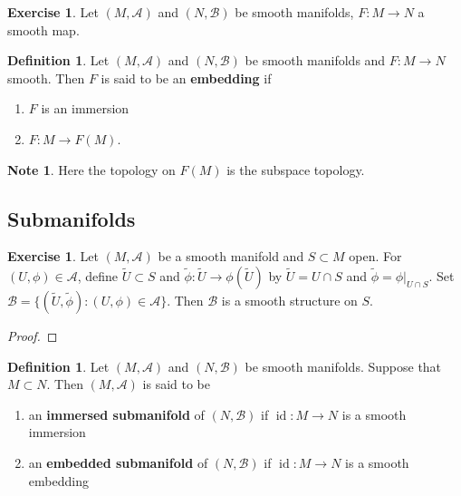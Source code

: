 \documentclass[12pt]{amsart}
\theoremstyle{definition}
\newtheorem{defn}[definition]{Definition}
\newtheorem{note}[definition]{Note}
\newtheorem{ex}[definition]{Exercise}
\newcommand{\MA}{\mathcal{A}}
\newcommand{\MB}{\mathcal{B}}
\DeclareMathOperator{\id}{id}
\begin{document}
	\begin{ex}
	Let $(M, \MA)$ and $(N, \MB)$ be smooth manifolds, $F: M \rightarrow N$ a smooth map. 
	\end{ex}
	
	\begin{defn}
	Let $(M, \MA)$ and $(N, \MB)$ be smooth manifolds and $F:M \rightarrow N$ smooth. Then $F$ is said to be an \textbf{embedding} if 
	\begin{enumerate}
	\item $F$ is an immersion
	\item $F:M \rightarrow F(M)$. 
\end{enumerate}	 
	\end{defn}	

	\begin{note}
	Here the topology on $F(M)$ is the subspace topology.
	\end{note}
	

	
	
	
	
	
	
	
	
	
	
	\newpage
	\subsection{Submanifolds}
	
	
	\begin{ex}
	Let $(M, \MA)$ be a smooth manifold and $S \subset M$ open. For $(U, \phi) \in \MA$, define $\tilde{U} \subset S$ and $\tilde{\phi}: \tilde{U} \rightarrow \phi(\tilde{U})$ by $\tilde{U} = U \cap S$ and $\tilde{\phi} = \phi|_{U \cap S}$. Set $\MB = \{(\tilde{U}, \tilde{\phi}): (U, \phi) \in \MA\}$.
	Then $\MB$ is a smooth structure on $S$.
	\end{ex}
	
	\begin{proof}
	
	\end{proof}
	
	
	
	\newpage

	\begin{defn}
		Let $(M, \MA)$ and  $(N, \MB)$ be smooth manifolds. Suppose that $M \subset N$. Then $(M, \MA)$ is said to be 
		\begin{enumerate}
		\item an \textbf{immersed submanifold} of $(N, \MB)$ if $\id:M \rightarrow N$ is a smooth immersion
		\item an \textbf{embedded submanifold} of $(N, \MB)$ if $\id:M \rightarrow N$ is a smooth embedding
		\end{enumerate}
	\end{defn}
	
\end{document}
